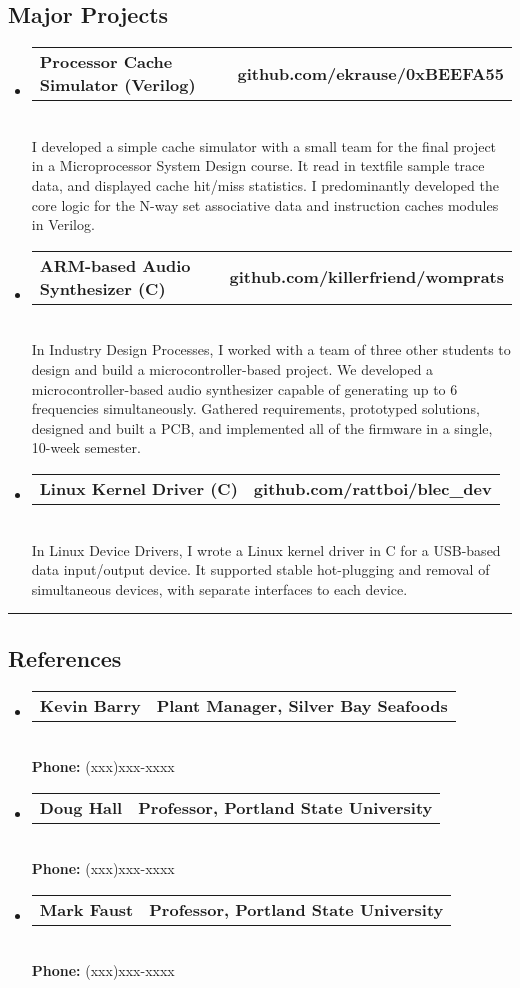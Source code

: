 \documentclass[10pt,letterpaper]{article}
\makeatletter
\newcommand{\headerrow}[2]
{\begin{tabular*}{\linewidth}{l@{\extracolsep{\fill}}r}
	#1 &
	#2 \\
\end{tabular*}}
\makeatother
\begin{document}
\subsection*{Major Projects}
\begin{itemize}
  \item 
  \headerrow 
  {\textbf{Processor Cache Simulator (Verilog)}}
  {\textbf{github.com/ekrause/0xBEEFA55}}
  \\
  I developed a simple cache simulator with a small team for the final project in a Microprocessor System Design course. It read in textfile sample trace data, and displayed cache hit/miss statistics. I predominantly developed the core logic for the N-way set associative data and instruction caches modules in Verilog.
  \item 
  \headerrow 
  {\textbf{ARM-based Audio Synthesizer (C)}}
  {\textbf{github.com/killerfriend/womprats}}
  \\
  In Industry Design Processes, I worked with a team of three other students to design and build a microcontroller-based project. We developed a microcontroller-based audio synthesizer capable of generating up to 6 frequencies simultaneously. Gathered requirements, prototyped solutions, designed and built a PCB, and implemented all of the firmware in a single, 10-week semester. 
  \item 
  \headerrow 
  {\textbf{Linux Kernel Driver (C)}}
  {\textbf{github.com/rattboi/blec\_dev}}
  \\
  In Linux Device Drivers, I wrote a Linux kernel driver in C for a USB-based data input/output device. It supported stable hot-plugging and removal of simultaneous devices, with separate interfaces to each device.
\end{itemize}
\vspace{1em}

\hrule
\vspace{-0.4em}
\subsection*{References}
\begin{itemize}
  \item
  \headerrow
    {\textbf{Kevin Barry}}
    {\textbf{Plant Manager, Silver Bay Seafoods}}
  \\
  \textbf{Phone: } (xxx)xxx-xxxx
  \item
  \headerrow
    {\textbf{Doug Hall}}
    {\textbf{Professor, Portland State University}}
  \\
  \textbf{Phone: } (xxx)xxx-xxxx
  \item
  \headerrow
    {\textbf{Mark Faust}}
    {\textbf{Professor, Portland State University}}
  \\
  \textbf{Phone: } (xxx)xxx-xxxx

\end{itemize}
\end{document}
